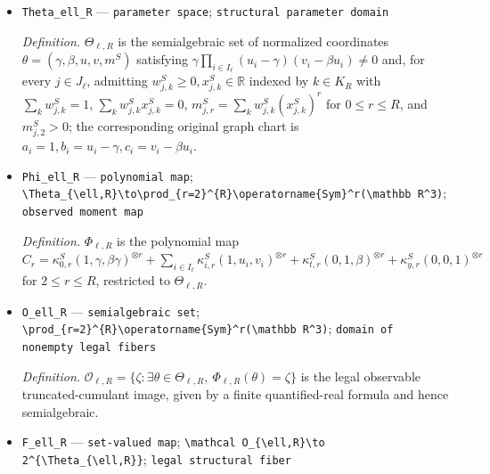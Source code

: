 \documentclass{article}
\begin{document}
\begin{itemize}
  \item \texttt{Theta\_\allowbreak{}ell\_\allowbreak{}R} --- \texttt{parameter space}; \texttt{structural parameter domain}
  \par\smallskip\noindent\emph{Definition.} \(\Theta_{\ell,R}\) is the semialgebraic set of normalized coordinates \(\theta=(\gamma,\beta,u,v,m^{S})\) satisfying \(\gamma\prod_{i\in I_{\ell}}(u_i-\gamma)(v_i-\beta u_i)\ne0\) and, for every \(j\in J_{\ell}\), admitting \(w^{S}_{j,k}\ge0,x^{S}_{j,k}\in\mathbb R\) indexed by \(k\in K_R\) with \(\sum_kw^{S}_{j,k}=1\), \(\sum_kw^{S}_{j,k}x^{S}_{j,k}=0\), \(m^{S}_{j,r}=\sum_kw^{S}_{j,k}(x^{S}_{j,k})^r\) for \(0\le r\le R\), and \(m^{S}_{j,2}>0\); the corresponding original graph chart is \(a_i=1,b_i=u_i-\gamma,c_i=v_i-\beta u_i\).
  \item \texttt{Phi\_\allowbreak{}ell\_\allowbreak{}R} --- \texttt{polynomial map}; \texttt{\textbackslash{}\allowbreak{}Theta\_\allowbreak{}\{\textbackslash{}\allowbreak{}ell,\allowbreak{}R\}\allowbreak{}\textbackslash{}\allowbreak{}to\textbackslash{}\allowbreak{}prod\_\allowbreak{}\{r=\allowbreak{}2\}\allowbreak{}\textasciicircum{}\{R\}\allowbreak{}\textbackslash{}\allowbreak{}operatorname\{Sym\}\allowbreak{}\textasciicircum{}r(\textbackslash{}\allowbreak{}mathbb R\textasciicircum{}3)}; \texttt{observed moment map}
  \par\smallskip\noindent\emph{Definition.} \(\Phi_{\ell,R}\) is the polynomial map \(C_r=\kappa^{S}_{0,r}(1,\gamma,\beta\gamma)^{\otimes r}+\sum_{i\in I_{\ell}}\kappa^{S}_{i,r}(1,u_i,v_i)^{\otimes r}+\kappa^{S}_{t,r}(0,1,\beta)^{\otimes r}+\kappa^{S}_{y,r}(0,0,1)^{\otimes r}\) for \(2\le r\le R\), restricted to \(\Theta_{\ell,R}\).
  \item \texttt{O\_\allowbreak{}ell\_\allowbreak{}R} --- \texttt{semialgebraic set}; \texttt{\textbackslash{}\allowbreak{}prod\_\allowbreak{}\{r=\allowbreak{}2\}\allowbreak{}\textasciicircum{}\{R\}\allowbreak{}\textbackslash{}\allowbreak{}operatorname\{Sym\}\allowbreak{}\textasciicircum{}r(\textbackslash{}\allowbreak{}mathbb R\textasciicircum{}3)}; \texttt{domain of nonempty legal fibers}
  \par\smallskip\noindent\emph{Definition.} \(\mathcal O_{\ell,R}=\{\zeta:\exists\theta\in\Theta_{\ell,R},\ \Phi_{\ell,R}(\theta)=\zeta\}\) is the legal observable truncated-cumulant image, given by a finite quantified-real formula and hence semialgebraic.
  \item \texttt{F\_\allowbreak{}ell\_\allowbreak{}R} --- \texttt{set-\allowbreak{}valued map}; \texttt{\textbackslash{}\allowbreak{}mathcal O\_\allowbreak{}\{\textbackslash{}\allowbreak{}ell,\allowbreak{}R\}\allowbreak{}\textbackslash{}\allowbreak{}to 2\textasciicircum{}\{\textbackslash{}\allowbreak{}Theta\_\allowbreak{}\{\textbackslash{}\allowbreak{}ell,\allowbreak{}R\}\allowbreak{}\}\allowbreak{}}; \texttt{legal structural fiber}

\end{itemize}
\end{document}

